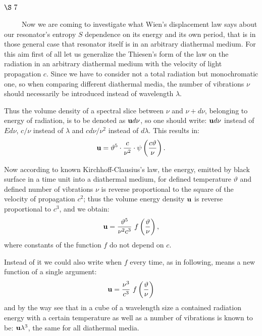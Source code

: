 \documentclass{article}
\begin{document}
\vspace{0.5cm}
\subsection*{
{\bf $\S~7$}}
\vspace{0.3cm}

~~~~~Now we are coming to investigate 
what Wien's displacement law says about our resonator's entropy $S$ 
dependence on its energy and its own period, that is in those general case 
that resonator itself is in an arbitrary diathermal medium.
For this aim first of all let us generalize the Thiesen's form of the law 
on the radiation in an arbitrary diathermal medium with the velocity 
of light propagation $c$.
Since we have to consider not a total radiation but monochromatic one, 
so when comparing different diathermal media, 
the number of vibrations $\nu$ should necessarily be introduced 
instead of wavelength $\lambda$.

Thus the volume density of a spectral slice between $\nu$ and $\nu + d \nu$, 
belonging to energy of radiation, is to be denoted as ${\cal \bf u} d \nu$,  
so one should write: ${\cal \bf u}d \nu$ instead of $E d \nu$, 
$c/\nu$ instead of $\lambda$ and $cd\nu/\nu^2$ instead of $d \lambda$. 
This results in:
$$
{\cal \bf u} = \vartheta^5\cdot\frac{c}{\nu^2}\cdot\psi\left( \frac{c \vartheta}{\nu}
\right).
$$

Now according to known Kirchhoff-Clausius's law, the energy, 
emitted by black surface in a time unit into a diathermal medium, 
for defined temperature $\vartheta$ 
and defined number of vibrations $\nu$ is reverse proportional 
to the square of the velocity of propagation $c^2$; 
thus the volume energy density ${\cal \bf u}$ 
is reverse proportional to $c^3$, and we obtain:
$$
{\cal \bf u} = \frac{\vartheta^5}{\nu^2 c^3} ~f\left( \frac
{\vartheta}{\nu} \right),
$$
where constants of the function $f$ do not depend on $c$.

Instead of it we could also write when $f$ every time, as in following, means 
a new function of a single argument: 
\begin{equation}
{\cal \bf u} = \frac{\nu^3}{c^3} ~ f\left( \frac{\vartheta}{\nu} 
\right)
\end{equation}
and by the way see 
that in a cube of a wavelength size a contained radiation energy 
with a certain temperature as well as a number of vibrations is known to be: 
${\cal \bf u} \lambda^3$, the same for all diathermal media.
\end{document}
